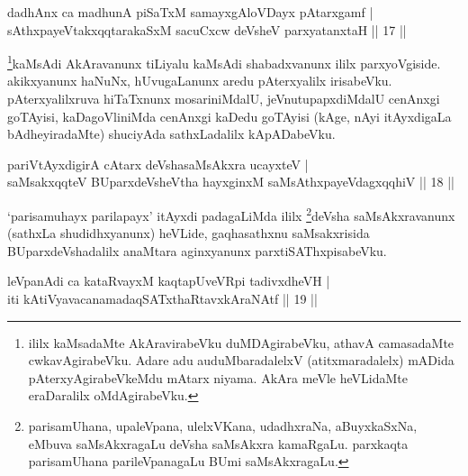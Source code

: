 \begin{shl}
dadhAnx ca madhunA piSaTxM samayxgAloVDayx pAtarxgamf | \\
sAthxpayeVtakxqqtarakaSxM sacuCxcw deVsheV parxyatanxtaH \hfill|| 17 || 
\end{shl}

\begin{artha}
\footnote{ililx kaMsadaMte AkAravirabeVku duMDAgirabeVku, athavA camasadaMte cwkavAgirabeVku. Adare adu auduMbaradalelxV (atitxmaradalelx) mADida pAterxyAgirabeVkeMdu mAtarx niyama. AkAra meVle heVLidaMte eraDaralilx oMdAgirabeVku.}kaMsAdi AkAravanunx tiLiyalu kaMsAdi shabadxvanunx ililx parxyoVgiside. akikxyanunx haNuNx, hUvugaLanunx aredu pAterxyalilx irisabeVku. pAterxyalilxruva hiTaTxnunx mosariniMdalU, jeVnutupapxdiMdalU cenAnxgi goTAyisi, kaDagoVliniMda  cenAnxgi kaDedu goTAyisi (kAge, nAyi itAyxdigaLa bAdheyiradaMte) shuciyAda sathxLadalilx kApADabeVku.
\end{artha}


\begin{shl}
pariVtAyxdigirA cAtarx deVshasaMsAkxra ucayxteV | \\
saMsakxqqteV BUparxdeVsheV\s tha hayxginxM saMsAthxpayeVdagxqqhiV \hfill|| 18 || 
\end{shl}

\begin{artha}
`parisamuhayx parilapayx' itAyxdi padagaLiMda ililx \footnote{parisamUhana, upaleVpana, ulelxVKana, udadhxraNa, aBuyxkaSxNa, eMbuva saMsAkxragaLu deVsha saMsAkxra kamaRgaLu. parxkaqta parisamUhana parileVpanagaLu BUmi saMsAkxragaLu.}deVsha saMsAkxravanunx (sathxLa shudidhxyanunx) heVLide, gaqhasathxnu saMsakxrisida BUparxdeVshadalilx anaMtara aginxyanunx parxtiSAThxpisabeVku.
\end{artha}

\begin{shl}
leVpanAdi ca kataRvayxM kaqtapUveVR\s pi tadivxdheVH | \\
\footnotemark[2]iti kAtiVyavacanamadaqSATxthaRtavxkAraNAtf \hfill|| 19 || 
\end{shl}

